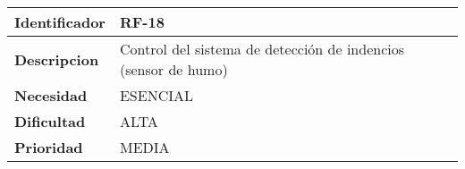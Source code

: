 \begin{center}
    \begin{tabular}{|p{2.6cm}|p{12cm}|}
    \hline
    \textbf{Identificador} & RF-18\\
    \hline
    \textbf{Descripcion} & Control del sistema de detección de indencios (sensor de humo)\\
    \hline
    \textbf{Necesidad} & ESENCIAL\\
    \hline
    \textbf{Dificultad} & ALTA\\
    \hline
    \textbf{Prioridad} & MEDIA\\
    \hline
    \end{tabular}
\end{center}
